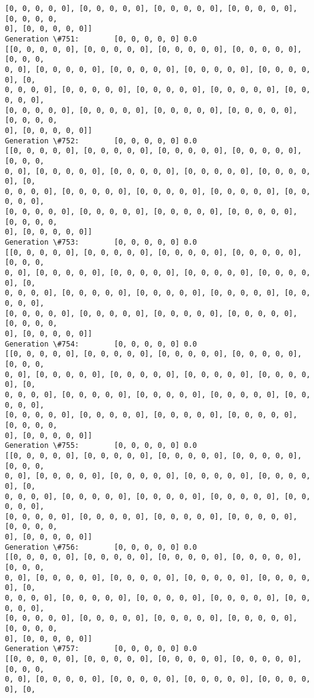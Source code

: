\documentclass[11pt]{article}
\begin{document}
\begin{Verbatim}[commandchars=\\\{\}]
[0, 0, 0, 0, 0], [0, 0, 0, 0, 0], [0, 0, 0, 0, 0], [0, 0, 0, 0, 0], [0, 0, 0, 0,
0], [0, 0, 0, 0, 0]]
Generation \#751:        [0, 0, 0, 0, 0] 0.0
[[0, 0, 0, 0, 0], [0, 0, 0, 0, 0], [0, 0, 0, 0, 0], [0, 0, 0, 0, 0], [0, 0, 0,
0, 0], [0, 0, 0, 0, 0], [0, 0, 0, 0, 0], [0, 0, 0, 0, 0], [0, 0, 0, 0, 0], [0,
0, 0, 0, 0], [0, 0, 0, 0, 0], [0, 0, 0, 0, 0], [0, 0, 0, 0, 0], [0, 0, 0, 0, 0],
[0, 0, 0, 0, 0], [0, 0, 0, 0, 0], [0, 0, 0, 0, 0], [0, 0, 0, 0, 0], [0, 0, 0, 0,
0], [0, 0, 0, 0, 0]]
Generation \#752:        [0, 0, 0, 0, 0] 0.0
[[0, 0, 0, 0, 0], [0, 0, 0, 0, 0], [0, 0, 0, 0, 0], [0, 0, 0, 0, 0], [0, 0, 0,
0, 0], [0, 0, 0, 0, 0], [0, 0, 0, 0, 0], [0, 0, 0, 0, 0], [0, 0, 0, 0, 0], [0,
0, 0, 0, 0], [0, 0, 0, 0, 0], [0, 0, 0, 0, 0], [0, 0, 0, 0, 0], [0, 0, 0, 0, 0],
[0, 0, 0, 0, 0], [0, 0, 0, 0, 0], [0, 0, 0, 0, 0], [0, 0, 0, 0, 0], [0, 0, 0, 0,
0], [0, 0, 0, 0, 0]]
Generation \#753:        [0, 0, 0, 0, 0] 0.0
[[0, 0, 0, 0, 0], [0, 0, 0, 0, 0], [0, 0, 0, 0, 0], [0, 0, 0, 0, 0], [0, 0, 0,
0, 0], [0, 0, 0, 0, 0], [0, 0, 0, 0, 0], [0, 0, 0, 0, 0], [0, 0, 0, 0, 0], [0,
0, 0, 0, 0], [0, 0, 0, 0, 0], [0, 0, 0, 0, 0], [0, 0, 0, 0, 0], [0, 0, 0, 0, 0],
[0, 0, 0, 0, 0], [0, 0, 0, 0, 0], [0, 0, 0, 0, 0], [0, 0, 0, 0, 0], [0, 0, 0, 0,
0], [0, 0, 0, 0, 0]]
Generation \#754:        [0, 0, 0, 0, 0] 0.0
[[0, 0, 0, 0, 0], [0, 0, 0, 0, 0], [0, 0, 0, 0, 0], [0, 0, 0, 0, 0], [0, 0, 0,
0, 0], [0, 0, 0, 0, 0], [0, 0, 0, 0, 0], [0, 0, 0, 0, 0], [0, 0, 0, 0, 0], [0,
0, 0, 0, 0], [0, 0, 0, 0, 0], [0, 0, 0, 0, 0], [0, 0, 0, 0, 0], [0, 0, 0, 0, 0],
[0, 0, 0, 0, 0], [0, 0, 0, 0, 0], [0, 0, 0, 0, 0], [0, 0, 0, 0, 0], [0, 0, 0, 0,
0], [0, 0, 0, 0, 0]]
Generation \#755:        [0, 0, 0, 0, 0] 0.0
[[0, 0, 0, 0, 0], [0, 0, 0, 0, 0], [0, 0, 0, 0, 0], [0, 0, 0, 0, 0], [0, 0, 0,
0, 0], [0, 0, 0, 0, 0], [0, 0, 0, 0, 0], [0, 0, 0, 0, 0], [0, 0, 0, 0, 0], [0,
0, 0, 0, 0], [0, 0, 0, 0, 0], [0, 0, 0, 0, 0], [0, 0, 0, 0, 0], [0, 0, 0, 0, 0],
[0, 0, 0, 0, 0], [0, 0, 0, 0, 0], [0, 0, 0, 0, 0], [0, 0, 0, 0, 0], [0, 0, 0, 0,
0], [0, 0, 0, 0, 0]]
Generation \#756:        [0, 0, 0, 0, 0] 0.0
[[0, 0, 0, 0, 0], [0, 0, 0, 0, 0], [0, 0, 0, 0, 0], [0, 0, 0, 0, 0], [0, 0, 0,
0, 0], [0, 0, 0, 0, 0], [0, 0, 0, 0, 0], [0, 0, 0, 0, 0], [0, 0, 0, 0, 0], [0,
0, 0, 0, 0], [0, 0, 0, 0, 0], [0, 0, 0, 0, 0], [0, 0, 0, 0, 0], [0, 0, 0, 0, 0],
[0, 0, 0, 0, 0], [0, 0, 0, 0, 0], [0, 0, 0, 0, 0], [0, 0, 0, 0, 0], [0, 0, 0, 0,
0], [0, 0, 0, 0, 0]]
Generation \#757:        [0, 0, 0, 0, 0] 0.0
[[0, 0, 0, 0, 0], [0, 0, 0, 0, 0], [0, 0, 0, 0, 0], [0, 0, 0, 0, 0], [0, 0, 0,
0, 0], [0, 0, 0, 0, 0], [0, 0, 0, 0, 0], [0, 0, 0, 0, 0], [0, 0, 0, 0, 0], [0,

\end{Verbatim}
\end{document}
